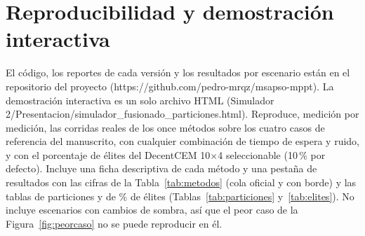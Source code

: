 \documentclass[letterpaper,11pt]{article}
\begin{document}
\section{Reproducibilidad y demostración interactiva}
El código, los reportes de cada versión y los resultados por escenario están en el repositorio del proyecto (https://github.com/pedro-mrqz/msapso-mppt). La demostración interactiva es un solo archivo HTML (Simulador 2/Presentacion/simulador\_fusionado\_particiones.html). Reproduce, medición por medición, las corridas reales de los once métodos sobre los cuatro casos de referencia del manuscrito, con cualquier combinación de tiempo de espera y ruido, y con el porcentaje de élites del DecentCEM 10$\times$4 seleccionable (10\,\% por defecto). Incluye una ficha descriptiva de cada método y una pestaña de resultados con las cifras de la Tabla~\ref{tab:metodos} (cola oficial y con borde) y las tablas de particiones y de \% de élites (Tablas~\ref{tab:particiones} y~\ref{tab:elites}). No incluye escenarios con cambios de sombra, así que el peor caso de la Figura~\ref{fig:peorcaso} no se puede reproducir en él.
\end{document}
